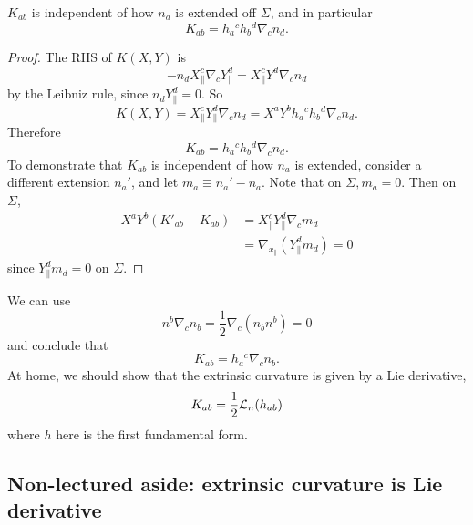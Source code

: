 \begin{lem}
    $K_{ab}$ is independent of how $n_a$ is extended off $\Sigma$, and in particular
    \begin{equation}
        K_{ab}=h_a{}^c h_b{}^d \nabla_c n_d.
    \end{equation}
\end{lem}
\begin{proof}
    The RHS of $K(X,Y)$ is
    \begin{equation}
        -n_d X_\parallel^c \nabla_c Y^d_{\parallel} = X_\parallel^c Y^d \nabla_c n_d
    \end{equation}
    by the Leibniz rule, since $n_d Y^d_\parallel=0$. So
    \begin{equation}
        K(X,Y)=X_\parallel^c Y^d_\parallel \nabla_c n_d = X^a Y^b h_a{}^c h_b{}^d \nabla_c n_d.
    \end{equation}
    Therefore
    \begin{equation}
        K_{ab}=h_a{}^c h_b{}^d \nabla_c n_d.
    \end{equation}
    To demonstrate that $K_{ab}$ is independent of how $n_a$ is extended, consider a different extension $n_a'$, and let $m_a \equiv n_a'-n_a$. Note that on $\Sigma, m_a=0$. Then on $\Sigma$,
    \begin{align*}
        X^a Y^b(K'_{ab}-K_{ab}) &= X_\parallel^c Y^d_\parallel \nabla_c m_d\\
        &= \nabla_{x_\parallel}(Y_\parallel^d m_d)=0
    \end{align*}
    since $Y_\parallel^d m_d =0$ on $\Sigma$.
\end{proof}

We can use
\begin{equation}
    n^b \nabla_c n_b = \frac{1}{2} \nabla_c(n_b n^b)=0
\end{equation}
and conclude that
\begin{equation}
    K_{ab}=h_a{}^c \nabla_c n_b.
\end{equation}
At home, we should show that the extrinsic curvature is given by a Lie derivative,
\begin{equation}
    K_{ab}=\frac{1}{2} \mathcal L_n (h_{ab})
\end{equation}
where $h$ here is the first fundamental form.

\subsection*{Non-lectured aside: extrinsic curvature is Lie derivative}

